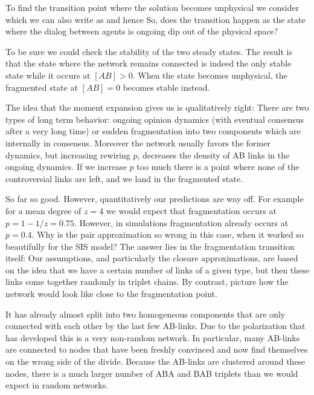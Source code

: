To find the transition point where the solution becomes unphysical we consider
which we can also write as 
and hence 
So, does the transition happen as the state where the dialog between agents is ongoing dip out of the physical space?

To be sure we could check the stability of the two steady states. The result is that 
the state where the network remains connected is indeed the only stable state while it occurs at $[AB]>0$. When the state becomes unphysical, the fragmented state at $[AB]=0$ becomes stable instead.

The idea that the moment expansion gives us is qualitatively right: There are two types of long term behavior: ongoing opinion dynamics (with eventual consensus after a very long time) or sudden fragmentation into two components which are internally in consensus. Moreover the network usually favors the former dynamics, but increasing rewiring $p$, decreases the density of AB links in the ongoing dynamics. If we increase $p$  too much there is a point where none of the  controversial links are left, and we land in the fragmented state. 

So far so good. However, quantitatively our predictions are way off. For example for a mean degree of $z=4$ we would expect that fragmentation occurs at $p=1-1/z=0.75$. However, in simulations fragmentation already occurs at $p=0.4$. Why is the pair approximation so wrong in this case, when it worked so beautifully for the SIS model?
The answer lies in the fragmentation transition itself: Our assumptions, and particularly the closure approximations, are based on the idea that we have a certain number of links of a given type, but then these links come together randomly in triplet chains. By contrast, picture how the network would look like close to the fragmentation point. 

It has already almost split into two homogeneous components that are only connected with each other by the last few AB-links. Due to the polarization that has developed this is a very non-random network. In particular, many AB-links are connected to nodes that have been freshly convinced and now find themselves on the wrong side of the divide. Because the AB-links are clustered around these nodes, there is a much larger number of ABA and BAB triplets than we would expect in random networks. 

